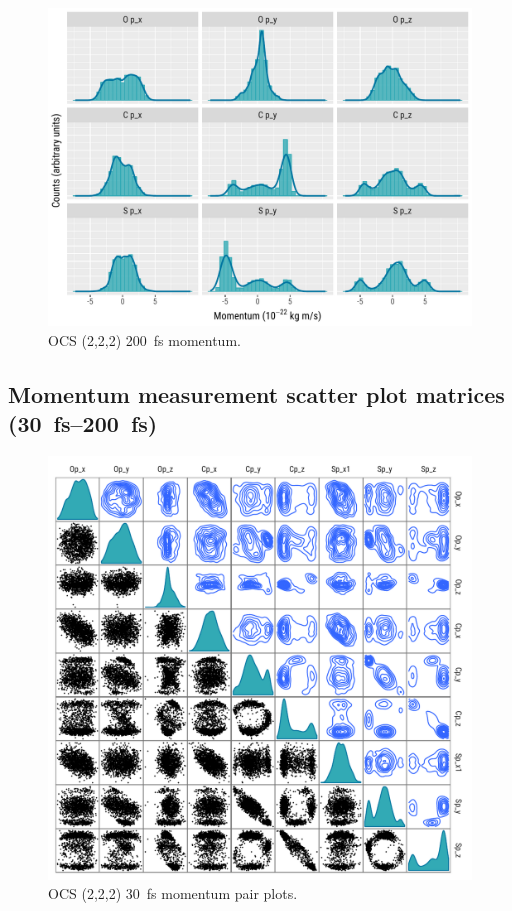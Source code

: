 \begin{figure}
  \centering
  \includegraphics[width=\textwidth]{Plots/OCS222200fsMomentum}
  \caption[OCS (2,2,2) \SI{200}{\fs} momentum.]
  {OCS (2,2,2) \SI{200}{\fs} momentum.}
  \label{fig:OCS222200fsMomentum}
\end{figure}

\subsection{Momentum measurement scatter plot matrices (\SIrange{30}{200}{\femto\s})}

\begin{figure}[H]
  \centering
  \includegraphics[width=\textwidth]{Plots/OCS22230fsMomentumPairPlots}
  \caption[OCS (2,2,2) \SI{30}{\fs} momentum pair plots.]
  {OCS (2,2,2) \SI{30}{\fs} momentum pair plots.}
  \label{fig:OCS22230fsMomentumPairPlots}
\end{figure}

